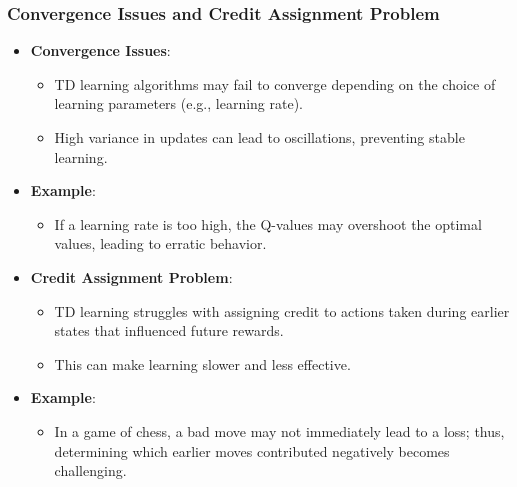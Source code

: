 \documentclass[aspectratio=169]{beamer}
\begin{document}
\begin{frame}[fragile]
    \frametitle{Convergence Issues and Credit Assignment Problem}
    \begin{itemize}
        \item \textbf{Convergence Issues}:
        \begin{itemize}
            \item TD learning algorithms may fail to converge depending on the choice of learning parameters (e.g., learning rate).
            \item High variance in updates can lead to oscillations, preventing stable learning.
        \end{itemize}
        \item \textbf{Example}:
        \begin{itemize}
            \item If a learning rate is too high, the Q-values may overshoot the optimal values, leading to erratic behavior.
        \end{itemize}
    \end{itemize}

    \begin{itemize}
        \item \textbf{Credit Assignment Problem}:
        \begin{itemize}
            \item TD learning struggles with assigning credit to actions taken during earlier states that influenced future rewards.
            \item This can make learning slower and less effective.
        \end{itemize}
        \item \textbf{Example}:
        \begin{itemize}
            \item In a game of chess, a bad move may not immediately lead to a loss; thus, determining which earlier moves contributed negatively becomes challenging.
        \end{itemize}
    \end{itemize}
\end{frame}
\end{document}
